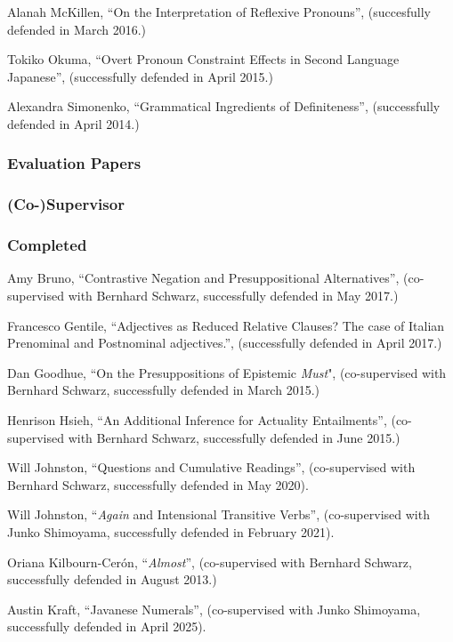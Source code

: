 \documentclass[11pt]{article}
\begin{document}
Alanah McKillen, ``On the Interpretation of Reflexive Pronouns'', (succesfully defended in March 2016.)

Tokiko Okuma, ``Overt Pronoun Constraint Effects in Second Language Japanese'', (successfully defended in April 2015.)

Alexandra Simonenko, ``Grammatical Ingredients of Definiteness'',
(successfully defended in April 2014.)
\vspace{-10pt}




\subsubsection*{Evaluation Papers}

\subsubsection*{(Co-)Supervisor}

\subsubsection*{Completed}


Amy Bruno, ``Contrastive Negation and Presuppositional Alternatives'', (co-supervised with Bernhard Schwarz, successfully defended in May 2017.)

Francesco Gentile, ``Adjectives as Reduced Relative Clauses?
The case of Italian Prenominal and Postnominal adjectives.'', (successfully defended in April  2017.)

Dan Goodhue, ``On the Presuppositions of Epistemic \textit{Must}", (co-supervised with Bernhard Schwarz, successfully defended in March 2015.)

Henrison Hsieh, ``An Additional Inference for Actuality Entailments'',
(co-supervised with Bernhard Schwarz, successfully defended in June 2015.)

Will Johnston, ``Questions and Cumulative Readings'', (co-supervised with Bernhard Schwarz, successfully defended in May 2020).

Will Johnston, ``\textit{Again} and Intensional Transitive Verbs'', (co-supervised with Junko Shimoyama, successfully defended in February 2021).

Oriana Kilbourn-Cer\'on, ``\textit{Almost}'', (co-supervised with Bernhard Schwarz,
successfully defended in August 2013.) 

Austin Kraft, ``Javanese Numerals'', (co-supervised with Junko Shimoyama, successfully defended in April 2025).
\end{document}
